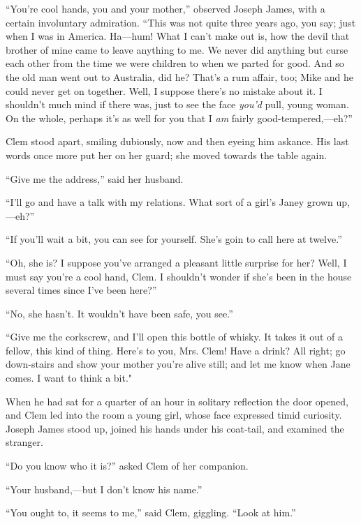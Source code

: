 ``You're cool hands, you and your mother,'' observed Joseph James, with
a certain involuntary admiration. ``This was not quite three years ago,
you say; just when I was in America. Ha---hum! What I can't make out is,
how the devil that brother of mine came to leave anything to me. We
never did anything but curse each other from the time we were children
to when we parted for good. And so the old man went out to Australia,
did he? That's a rum affair, too; Mike and he could never get on
together. Well, I suppose there's no mistake about it. I
{\protect\hypertarget{72}{}{}}shouldn't much mind if there was, just to
see the face \emph{you'd} pull, young woman. On the whole, perhaps it's
as well for you that I \emph{am} fairly good-tempered,---eh?''

Clem stood apart, smiling dubiously, now and then eyeing him askance.
His last words once more put her on her guard; she moved towards the
table again.

``Give me the address,'' said her husband.

``I'll go and have a talk with my relations. What sort of a girl's Janey
grown up,---eh?''

``If you'll wait a bit, you can see for yourself. She's goin to call
here at twelve.''

``Oh, she is? I suppose you've arranged a pleasant little surprise for
her? Well, I must say you're a cool hand, Clem. I shouldn't wonder if
she's been in the house several times since I've been here?''

``No, she hasn't. It wouldn't have been safe, you see.''

``Give me the corkscrew, and I'll open this bottle of whisky. It takes
it out of a fellow, this kind of thing. Here's to you, Mrs. Clem! Have a
drink? All right; go {\protect\hypertarget{73}{}{}}down-stairs and show
your mother you're alive still; and let me know when Jane comes. I want
to think a bit."

When he had sat for a quarter of an hour in solitary reflection the door
opened, and Clem led into the room a young girl, whose face expressed
timid curiosity. Joseph James stood up, joined his hands under his
coat-tail, and examined the stranger.

``Do you know who it is?'' asked Clem of her companion.

``Your husband,---but I don't know his name.''

``You ought to, it seems to me,'' said Clem, giggling. ``Look at him.''

